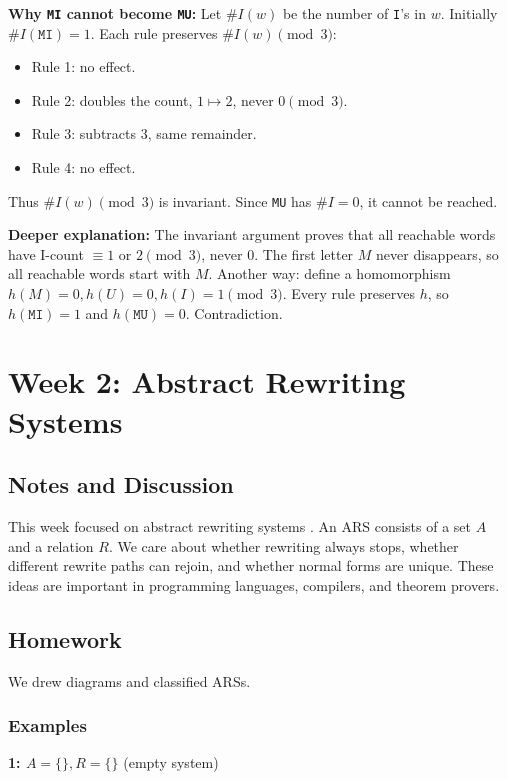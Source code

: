 \documentclass{article}
\theoremstyle{theorem}
\theoremstyle{definition}
\theoremstyle{remark}
\begin{document}
\textbf{Why \texttt{MI} cannot become \texttt{MU}:}  
Let $\#I(w)$ be the number of \texttt{I}'s in $w$. Initially $\#I(\texttt{MI})=1$. 
Each rule preserves $\#I(w) \pmod{3}$:
\begin{itemize}
  \item Rule 1: no effect.
  \item Rule 2: doubles the count, $1 \mapsto 2$, never $0 \pmod 3$.
  \item Rule 3: subtracts 3, same remainder.
  \item Rule 4: no effect.
\end{itemize}
Thus $\#I(w) \pmod{3}$ is invariant. Since \texttt{MU} has $\#I=0$, it cannot be reached.

\textbf{Deeper explanation:}  
The invariant argument proves that all reachable words have I-count $\equiv 1$ or $2 \pmod{3}$, never 0.  
The first letter $M$ never disappears, so all reachable words start with $M$.  
Another way: define a homomorphism $h(M)=0, h(U)=0, h(I)=1 \pmod 3$. 
Every rule preserves $h$, so $h(\texttt{MI})=1$ and $h(\texttt{MU})=0$. Contradiction.  

\section{Week 2: Abstract Rewriting Systems}

\subsection{Notes and Discussion}
This week focused on abstract rewriting systems . 
An ARS consists of a set $A$ and a relation $R$. 
We care about whether rewriting always stops, whether different rewrite paths can rejoin, and whether normal forms are unique. 
These ideas are important in programming languages, compilers, and theorem provers.

\subsection{Homework}
We drew diagrams and classified ARSs.

\subsubsection*{Examples}
\begin{tikzpicture}
\end{tikzpicture}

\textbf{1: $A=\{\}, R=\{\}$} (empty system)
\end{document}
